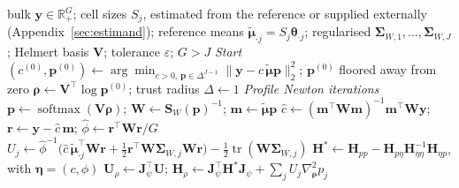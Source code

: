 \documentclass[pdflatex, sn-nature]{sn-jnl}
\theoremstyle{thmstyleone}%
\theoremstyle{thmstyletwo}%
\theoremstyle{thmstylethree}%
\begin{document}
\begin{algorithm}[ht]
  \caption{Profile Newton fit of \eqref{eq:sc-model} for one bulk sample: the two nuisance scales are concentrated out in
    closed form at every composition, and a trust-region Newton method maximises the profile log-likelihood of the cell
    fractions.}
  \label{alg:sc-two-stage}
  \begin{algorithmic}[1]
    \Require bulk \(\boldsymbol{y}\in\mathbb{R}_{+}^{G}\); cell sizes \(S_{j}\), estimated from the reference or supplied
      externally (Appendix~\ref{sec:estimand}); reference means \(\tilde{\boldsymbol{\mu}}_{\cdot j}=S_{j}\boldsymbol{\theta}_{\cdot j}\);
      regularised \(\boldsymbol{\Sigma}_{W,1},\ldots,\boldsymbol{\Sigma}_{W,J}\); Helmert basis \(\mathbf{V}\); tolerance \(\varepsilon\); \(G>J\)
    \Statex \textit{Start}
    \State \((c^{(0)},\boldsymbol{p}^{(0)})\gets\arg\min_{c>0,\,\boldsymbol{p}\in\Delta^{J-1}}\lVert\boldsymbol{y}-c\,\tilde{\boldsymbol{\mu}}\boldsymbol{p}\rVert_{2}^{2}\);
      \(\boldsymbol{p}^{(0)}\) floored away from zero
    \State \(\boldsymbol{\rho}\gets\mathbf{V}^{\top}\log\boldsymbol{p}^{(0)}\); trust radius \(\Delta\gets1\)
    \Statex \textit{Profile Newton iterations}
    \Repeat
      \State \(\boldsymbol{p}\gets\operatorname{softmax}(\mathbf{V}\boldsymbol{\rho})\);
        \(\boldsymbol{W}\gets\boldsymbol{S}_{W}(\boldsymbol{p})^{-1}\);
        \(\boldsymbol{m}\gets\tilde{\boldsymbol{\mu}}\boldsymbol{p}\)
      \State \(\hat c\gets(\boldsymbol{m}^{\top}\boldsymbol{W}\boldsymbol{m})^{-1}\boldsymbol{m}^{\top}\boldsymbol{W}\boldsymbol{y}\);
        \(\boldsymbol{r}\gets\boldsymbol{y}-\hat c\,\boldsymbol{m}\);
        \(\hat\phi\gets\boldsymbol{r}^{\top}\boldsymbol{W}\boldsymbol{r}/G\)
      \State \(U_{j}\gets\hat\phi^{-1}\bigl(\hat c\,\tilde{\boldsymbol{\mu}}_{\cdot j}^{\top}\boldsymbol{W}\boldsymbol{r}
        +\tfrac12\boldsymbol{r}^{\top}\boldsymbol{W}\boldsymbol{\Sigma}_{W,j}\boldsymbol{W}\boldsymbol{r}\bigr)
        -\tfrac12\operatorname{tr}(\boldsymbol{W}\boldsymbol{\Sigma}_{W,j})\)
      \State \(\boldsymbol{H}^{\ast}\gets\boldsymbol{H}_{pp}-\boldsymbol{H}_{p\eta}\boldsymbol{H}_{\eta\eta}^{-1}\boldsymbol{H}_{\eta p}\), with \(\boldsymbol{\eta}=(c,\phi)\)
      \State \(\boldsymbol{U}_{\rho}\gets\mathbf{J}_{\psi}^{\top}\boldsymbol{U}\);
        \(\boldsymbol{H}_{\rho}\gets\mathbf{J}_{\psi}^{\top}\boldsymbol{H}^{\ast}\mathbf{J}_{\psi}+\sum_{j}U_{j}\nabla^{2}_{\boldsymbol{\rho}}p_{j}\)

\end{algorithmic}
\end{algorithm}
\end{document}
